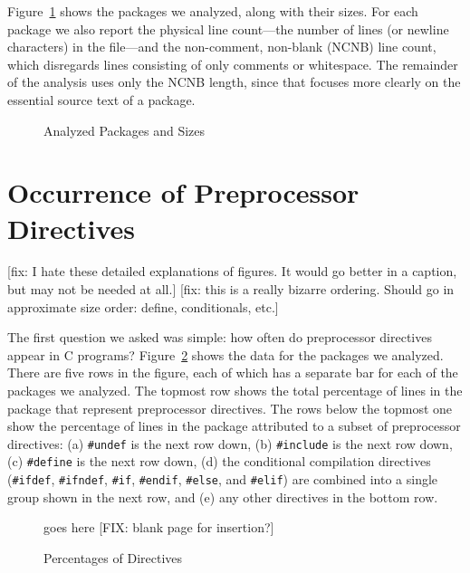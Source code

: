 Figure~\ref{fig:packages} shows the packages we analyzed, along with their
sizes.  For each package we also report the physical line count---the
number of lines (or newline characters) in the file---and the non-comment,
non-blank (NCNB) line count, which disregards lines consisting of only
comments or whitespace.  The remainder of the analysis uses only the NCNB
length, since that focuses more clearly on the essential source text of a
package.

\begin{figure}

\caption{Analyzed Packages and Sizes\label{fig:packages}}
\end{figure}


\section{Occurrence of Preprocessor Directives}\label{sec:directives}

[fix: I hate these detailed explanations of figures.  It would go better in
a caption, but may not be needed at all.]
[fix: this is a really bizarre ordering.  Should go in approximate size
order: define, conditionals, etc.]

The first question we asked was simple: how often do
preprocessor directives appear in C programs?
Figure~\ref{fig:directives} shows the data for the packages we
analyzed.  There are five rows in the figure, each of which has a
separate bar for each of the packages we analyzed.  The topmost row
shows the total percentage of lines in the package that represent
preprocessor directives.  The rows below the topmost one show the
percentage of lines in the package attributed to a subset of
preprocessor directives: (a) \verb+#undef+ is the next row down, (b)
\verb+#include+ is the next row down, (c) \verb+#define+ is the next
row down, (d) the conditional compilation directives (\verb+#ifdef+,
\verb+#ifndef+, \verb+#if+, \verb+#endif+, \verb+#else+, and
\verb+#elif+) are combined into a single group shown in the next row,
and (e) any other directives in the bottom row. 

\begin{figure}
goes here [FIX: blank page for insertion?]
\caption{Percentages of Directives\label{fig:directives}}
\end{figure}

